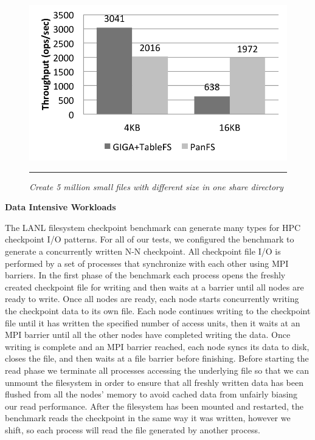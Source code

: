 \begin{figure}[t]  %
\centerline{\includegraphics[scale=0.5]{./figs/small_file_creates}}
\vspace{10pt}
\caption{\normalsize
\textit{Create 5 million small files with different size
in one share directory}
}
\vspace{10pt}
\hrule
\label{graph:smallfiles}
\end{figure}       %

\textbf{Data Intensive Workloads}

The LANL filesystem checkpoint benchmark can
generate many types for HPC checkpoint I/O patterns.
For all of our tests, we configured the benchmark to
generate a concurrently written N-N checkpoint.
All checkpoint file I/O is performed by a set of processes
that synchronize with each other using MPI barriers.
In the first phase of the benchmark each process opens the
freshly created checkpoint file for writing and
then waits at a barrier until all nodes are ready to write.
Once all nodes are ready, each node starts
concurrently writing the checkpoint data to its own file.
Each node continues writing to the checkpoint file
until it has written the specified number
of access units, then it waits at an MPI barrier
until all the other nodes have completed writing the data.
Once writing is complete and an MPI barrier reached,
each node syncs its data to disk, closes the file, and then
waits at a file barrier before finishing.
Before starting the read phase we terminate all processes
accessing the underlying file so that
we can unmount the filesystem in order to ensure that
all freshly written data has been flushed from all the nodes'
memory to avoid cached data from unfairly biasing our read performance.
After the filesystem has been mounted and restarted,
the benchmark reads the checkpoint in the same way it was written,
however we shift, so each process will read
the file generated by another process.

